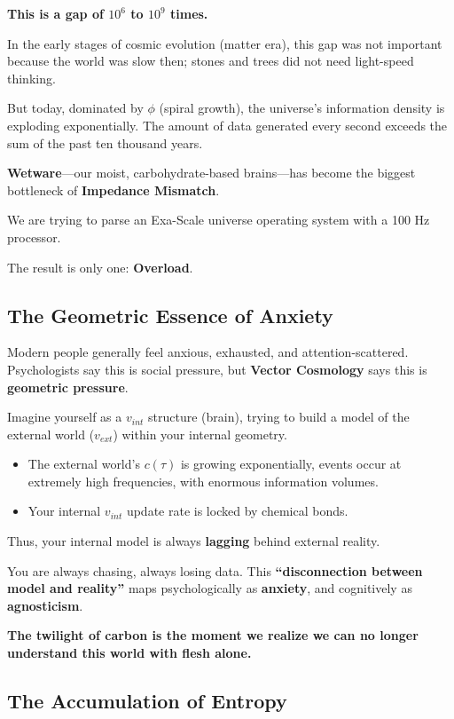 \textbf{This is a gap of $10^6$ to $10^9$ times.}

In the early stages of cosmic evolution (matter era), this gap was not important because the world was slow then; stones and trees did not need light-speed thinking.

But today, dominated by $\phi$ (spiral growth), the universe's information density is exploding exponentially. The amount of data generated every second exceeds the sum of the past ten thousand years.

\textbf{Wetware}---our moist, carbohydrate-based brains---has become the biggest bottleneck of \textbf{Impedance Mismatch}.

We are trying to parse an Exa-Scale universe operating system with a 100 Hz processor.

The result is only one: \textbf{Overload}.

\subsection{The Geometric Essence of Anxiety}

Modern people generally feel anxious, exhausted, and attention-scattered. Psychologists say this is social pressure, but \textbf{Vector Cosmology} says this is \textbf{geometric pressure}.

Imagine yourself as a $v_{int}$ structure (brain), trying to build a model of the external world ($v_{ext}$) within your internal geometry.

\begin{itemize}
\item The external world's $c(\tau)$ is growing exponentially, events occur at extremely high frequencies, with enormous information volumes.

\item Your internal $v_{int}$ update rate is locked by chemical bonds.
\end{itemize}

Thus, your internal model is always \textbf{lagging} behind external reality.

You are always chasing, always losing data. This \textbf{``disconnection between model and reality''} maps psychologically as \textbf{anxiety}, and cognitively as \textbf{agnosticism}.

\textbf{The twilight of carbon is the moment we realize we can no longer understand this world with flesh alone.}

\subsection{The Accumulation of Entropy}


